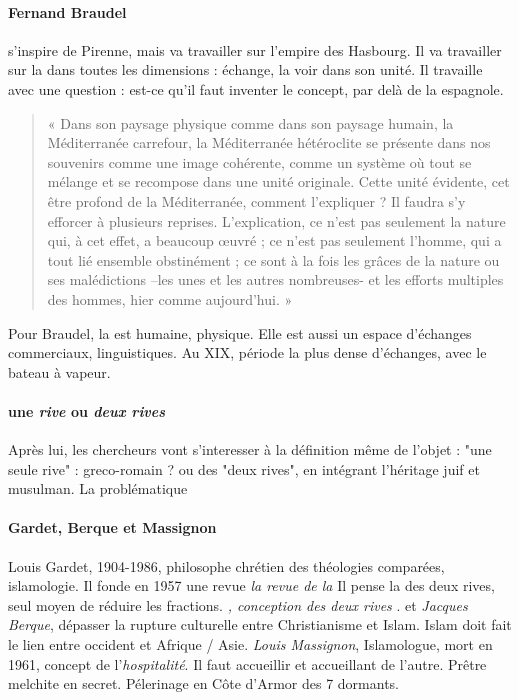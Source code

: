 \paragraph{Fernand Braudel} s'inspire de Pirenne, mais va travailler sur l'empire des Hasbourg. Il va travailler sur la \Med dans toutes les dimensions : échange, la voir dans son unité. Il travaille avec une question : est-ce qu'il faut inventer le concept, par delà de la \Med espagnole. 

\begin{quote}
    « Dans son paysage physique comme dans son paysage humain, la Méditerranée carrefour, la Méditerranée hétéroclite se présente dans nos souvenirs comme une image cohérente, comme un système où tout se mélange et se recompose dans une unité originale. Cette unité évidente, cet être profond de la Méditerranée, comment l’expliquer ? Il faudra s’y efforcer à plusieurs reprises. L’explication, ce n’est pas seulement la nature qui, à cet effet, a beaucoup œuvré ; ce n’est pas seulement l’homme, qui a tout lié ensemble obstinément ; ce sont à la fois les grâces de la nature ou ses malédictions –les unes et les autres nombreuses- et les efforts multiples des hommes, hier comme aujourd’hui. »
\end{quote}

Pour Braudel, la \Med est humaine, physique. Elle est aussi un espace d'échanges commerciaux, linguistiques. Au XIX, période la plus dense d'échanges, avec le bateau à vapeur. 


\paragraph{une \textit{rive} ou \textit{deux rives}}Après lui, les chercheurs vont s'interesser à la définition même de l'objet : "une seule rive" : greco-romain ? ou des "deux rives", en intégrant l'héritage juif et musulman. La problématique 

\paragraph{Gardet, Berque et Massignon}{Louis Gardet, 1904-1986, philosophe chrétien des théologies comparées, islamologie. Il fonde en 1957 une revue \textit{la revue de la \Med}Il pense la \Med des deux rives, seul moyen de réduire les fractions. \textit{\Med, conception des deux rives } }. et \textit{Jacques Berque}, dépasser la rupture culturelle entre Christianisme et Islam. Islam doit fait le lien entre occident et Afrique / Asie. \textit{Louis Massignon}, Islamologue, mort en 1961, concept de l'\textit{hospitalité}. Il faut accueillir et accueillant de l'autre. Prêtre melchite en secret. Pélerinage en Côte d'Armor des 7 dormants.


